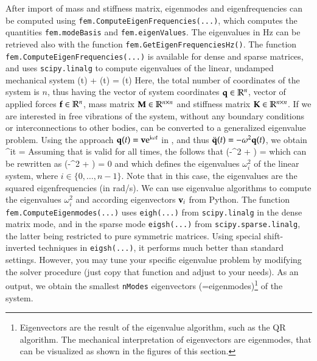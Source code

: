 After import of mass and stiffness matrix, eigenmodes and eigenfrequencies can be computed using \texttt{fem.ComputeEigenFrequencies(...)}, 
which computes the quantities \texttt{fem.modeBasis} and \texttt{fem.eigenValues}.
The eigenvalues in Hz can be retrieved also with the function \texttt{fem.GetEigenFrequenciesHz()}.
The function \texttt{fem.ComputeEigenFrequencies(...)} is available for dense and sparse matrices, and uses \texttt{scipy.linalg} to compute eigenvalues of the linear, undamped mechanical system
\be \label{theory:eigenmodes:EOM}
  \Mm \ddot \qv(t) + \Km \qv(t) = \fv(t) \eqDot
\ee
Here, the total number of coordinates of the system is $n$, 
thus having the vector of system coordinates $\mathbf{q} \in \mathbb{R}^n$, 
vector of applied forces $\mathbf{f} \in \mathbb{R}^n$, 
mass matrix $\mathbf{M} \in \mathbb{R}^{n \times n}$ and stiffness matrix $\mathbf{K} \in \mathbb{R}^{n \times n}$. 
If we are interested in free vibrations of the system, without any boundary conditions or interconnections to other bodies,  can be converted to a generalized eigenvalue problem. Using the approach 
$\mathbf{q}(t) = \mathbf{v} \mathrm{e}^{\mathrm{i} \omega t}$ in , and thus $\ddot {\mathbf{q}}(t) = -\omega^2 \mathbf{q}(t)$, we obtain
\be \label{theory:eigenmodes:harmonicEquation}
    \left[ \left(-\omega^2 \Mm + \Km \right) \vv \right] ^{i\omega t} = \Null \eqDot
\ee
Assuming that  is valid for all times, the  follows that
\be \label{theory:eigenmodes:GEP}
  \left(-\omega^2 \Mm + \Km \right) \vv = \Null \eqComma
\ee
which can be rewritten as
\be \label{theory:eigenmodes:GEP2}
  \det \left(-\omega^2 \Mm + \Km \right) = 0 \eqComma
\ee
and which defines the eigenvalues $\omega_i^2$ of the linear system, where $i \in \{0, \ldots, n-1\}$. Note that in this case, the eigenvalues are the squared eigenfrequencies (in rad/s).
We can use eigenvalue algorithms to compute the eigenvalues $\omega_i^2$ and according eigenvectors $\mathbf{v}_i$ from Python.
The function \texttt{fem.ComputeEigenmodes(...)} uses \texttt{eigh(...)} from \texttt{scipy.linalg} in the dense matrix mode, 
and in the sparse mode \texttt{eigsh(...)} from \texttt{scipy.sparse.linalg}, the latter being restricted to pure symmetric matrices.
Using special shift-inverted techniques in \texttt{eigsh(...)}, it performs much better than standard settings. However, you may tune your specific eigenvalue problem by modifying the solver procedure (just copy that function and adjust to your needs).
As an output, we obtain the smallest \texttt{nModes} eigenvectors (=eigenmodes)\footnote{Eigenvectors are the result of the eigenvalue algorithm, such as the QR algorithm. The mechanical interpretation of eigenvectors are eigenmodes, that can be visualized as shown in the figures of this section.} of the system.
